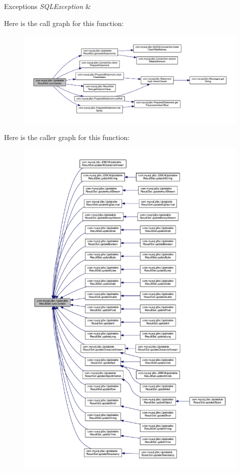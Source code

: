\begin{DoxyExceptions}{Exceptions}
{\em S\+Q\+L\+Exception} & \\
\hline
\end{DoxyExceptions}
Here is the call graph for this function\+:
\nopagebreak
\begin{figure}[H]
\begin{center}
\leavevmode
\includegraphics[width=350pt]{classcom_1_1mysql_1_1jdbc_1_1_updatable_result_set_a8504fb4ab23940b812d45b460a44318d_cgraph}
\end{center}
\end{figure}
Here is the caller graph for this function\+:
\nopagebreak
\begin{figure}[H]
\begin{center}
\leavevmode
\includegraphics[width=350pt]{classcom_1_1mysql_1_1jdbc_1_1_updatable_result_set_a8504fb4ab23940b812d45b460a44318d_icgraph}
\end{center}
\end{figure}
